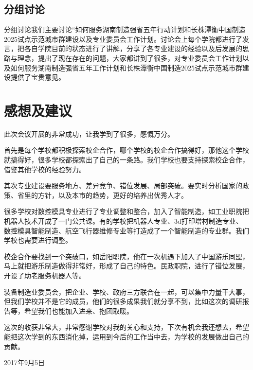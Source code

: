 \documentclass[UTF8,zihao=-4]{ctexart}
\begin{document}
\subsection{分组讨论} 
分组讨论我们主要讨论“如何服务湖南制造强省五年行动计划和长株潭衡中国制造2025试点示范城市群建设以及专业委员会工作计划。讨论会上每个学院都进行了发言，把各自学院目前的状态进行了讲解，分享了各专业建设的经验以及后发展的思路与理念，提出了现在存在的问题，大家都讲到了很多，对专业委员会工作计划以及如何服务湖南制造强省五年工作计划和长株潭衡中国制造2025试点示范城市群建设提供了宝贵意见。

\section{感想及建议}
此次会议开展的非常成功，让我学到了很多，感慨万分。

首先是每个学校都积极探索校企合作，哪个学校的校企合作搞得好，那他这个学校就搞得好，很多学校都探索出了自己的一条路。我们学校也要支持探索校企合作，借鉴其他学校的经验努力。

其次专业建设要服务地方、差异竞争、错位发展、局部突破。要实时分析国家的政策、省里的方针，以及本市的趋势，更好的培养出优秀人才。

很多学校对数控模具专业进行了专业调整和整合，加入了智能制造，如工业职院把机器人技术开成了一门公共课。有的学校把机器人专业、3d打印增材制造专业、数控模具智能制造、航空飞行器维修专业等打造成了一个智能制造的专业群。我们学校也需要进行调整。

校企合作要找到一个突破口，如岳阳职院，他在一次机遇下加入了中国游乐同盟，马上就把游乐制造做得非常好，形成了自己的特色。民政职院，进行了错位发展，开设了助老服务机器人等。

装备制造业委员会，把企业、学校、政府三方联合在一起，可以集中力量干大事，但我们学校并不是它的成员，他们的很多成果我们就分享不到，比如这次的调研报告等，希望我们也能加入进来、抱团取暖。

这次的收获非常大，非常感谢学校对我的关心和支持，下次有机会我还想去，希望能把这次学到的东西消化掉，运用到今后的工作当中去，为学校的发展做出自己的贡献。


\flushright  2017年9月5日 \hspace{2cm}
\end{document}
